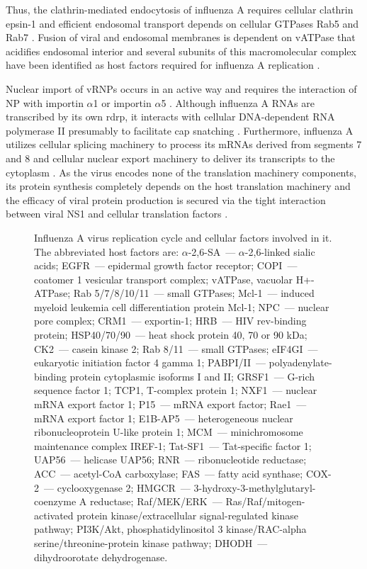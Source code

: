 	Thus, the clathrin-mediated endocytosis of influenza A requires cellular clathrin epsin-1 \parencite{Chen2008a} and efficient endosomal transport depends on cellular GTPases Rab5 and Rab7 \parencite{Sieczkarski2003}. Fusion of viral and endosomal membranes is dependent on \gls{vATPase} that acidifies endosomal interior and several subunits of this macromolecular complex have been identified as host factors required for influenza A replication \parencite{Watanabe2010}. 
	
	Nuclear import of \gls{vRNP}s occurs in an active way and requires the interaction of \gls{NP} with importin $\alpha$1 or importin $\alpha$5 \parencite{Cros2005}. Although influenza A RNAs are transcribed by its own \gls{rdrp}, it interacts with cellular DNA-dependent RNA polymerase II presumably to facilitate cap snatching \parencite{Engelhardt2005}. Furthermore, influenza A utilizes cellular splicing machinery to process its mRNAs derived from segments 7 and 8 \parencite{Dubois2014} and cellular nuclear export machinery to deliver its transcripts to the cytoplasm \parencite{York2013}. As the virus encodes none of the translation machinery components, its protein synthesis completely depends on the host translation machinery and the efficacy of viral protein production is secured via the tight interaction between viral \gls{NS1} and cellular translation factors \parencite{DelaLuna1995, Burgui2003, Aragon2000}.
	
	\begin{figure}[h!]
				\centering
				\caption{Influenza A virus replication cycle and cellular factors involved in it. The abbreviated host factors are: $\alpha$-2,6-SA~--- $\alpha$-2,6-linked sialic acids; EGFR~--- epidermal growth factor receptor; COPI~--- coatomer 1 vesicular transport complex; vATPase, vacuolar H+-ATPase; Rab 5/7/8/10/11~--- small GTPases; Mcl-1~--- induced myeloid leukemia cell differentiation protein Mcl-1; NPC~--- nuclear pore complex; CRM1~--- exportin-1; HRB~--- HIV rev-binding protein; HSP40/70/90~--- heat shock protein 40, 70 or 90 kDa; CK2~--- casein kinase 2; Rab 8/11~--- small GTPases; eIF4GI~--- eukaryotic initiation factor 4 gamma 1; PABPI/II~--- polyadenylate-binding protein cytoplasmic isoforms I and II; GRSF1~--- G-rich sequence factor 1; TCP1, T-complex protein 1;  NXF1~--- nuclear mRNA export factor 1; P15~--- mRNA export factor; Rae1~--- mRNA export factor 1; E1B-AP5~--- heterogeneous nuclear ribonucleoprotein U-like protein 1; MCM~--- minichromosome maintenance complex IREF-1; Tat-SF1~--- Tat-specific factor 1; UAP56~--- helicase UAP56; RNR~--- ribonucleotide reductase; ACC~--- acetyl-CoA carboxylase; FAS~--- fatty acid synthase; COX-2~--- cyclooxygenase 2; HMGCR~--- 3-hydroxy-3-methylglutaryl-coenzyme A reductase; Raf/MEK/ERK~--- Ras/Raf/mitogen-activated protein kinase/extracellular signal-regulated kinase pathway; PI3K/Akt, phosphatidylinositol 3 kinase/RAC-alpha serine/threonine-protein kinase pathway; DHODH~--- dihydroorotate dehydrogenase.} \label{fig:cycle}
			\end{figure}	
	
